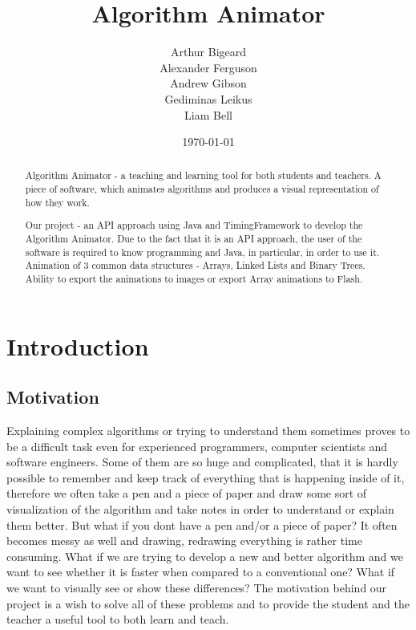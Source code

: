 \documentclass{l3proj}
\begin{document}
\title{Algorithm Animator}
\author{Arthur Bigeard \\
		Alexander Ferguson \\
		Andrew Gibson \\
		Gediminas Leikus \\
		Liam Bell}
\usdate
\date{\today}
\maketitle
\begin{abstract}

Algorithm Animator - a teaching and learning tool for both students and teachers. A piece of software, which animates algorithms and produces a visual representation of how they work.

Our project - an API approach using Java and TimingFramework to develop the Algorithm Animator. Due to the fact that it is an API approach, the user of the software is required to know programming and Java, in particular, in order to use it. Animation of 3 common data structures - Arrays, Linked Lists and Binary Trees. Ability to export the animations to images or export Array animations to Flash.

\end{abstract}
\educationalconsent
\tableofcontents
\chapter{Introduction}
\label{intro}

\section{Motivation}
Explaining complex algorithms or trying to understand them sometimes proves to be a difficult task even for experienced programmers, computer scientists and software engineers. Some of them are so huge and complicated, that it is hardly possible to remember and keep track of everything that is happening inside of it, therefore we often take a pen and a piece of paper and draw some sort of visualization of the algorithm and take notes in order to understand or explain them better. But what if you dont have a pen and/or a piece of paper? It often becomes messy as well and drawing, redrawing everything is rather time consuming. What if we are trying to develop a new and better algorithm and we want to see whether it is faster when compared to a conventional one? What if we want to visually see or show these differences? The motivation behind our project is a wish to solve all of these problems and to provide the student and the teacher a useful tool to both learn and teach. 
\end{document}
